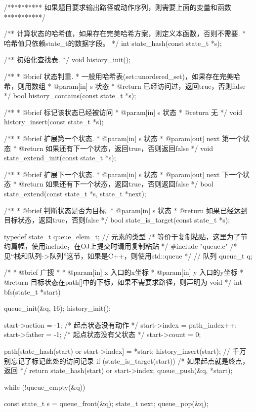 \begin{Codex}[label=bfs_template.c]
/********** 如果题目要求输出路径或动作序列，则需要上面的变量和函数 ***********/

/** 计算状态的哈希值，如果存在完美哈希方案，则定义本函数，否则不需要.
 * 哈希值只依赖state_t的数据字段。
 */
int state_hash(const state_t *s);

/** 初始化查找表. */
void history_init();

/**
 * @brief 状态判重.
 * 一般用哈希表(set::unordered_set)，如果存在完美哈希，则用数组
 * @param[in] s 状态
 * @return 已经访问过，返回true，否则false
 */
bool history_contains(const state_t *s);

/**
 * @brief 标记该状态已经被访问
 * @param[in] s 状态
 * @return 无
 */
void history_insert(const state_t *s);

/**
 * @brief 扩展第一个状态.
 * @param[in] s 状态
 * @param[out] next 第一个状态
 * @return 如果还有下一个状态，返回true，否则返回false
 */
void state_extend_init(const state_t *s);

/**
 * @brief 扩展下一个状态.
 * @param[in] s 状态
 * @param[out] next 下一个状态
 * @return 如果还有下一个状态，返回true，否则返回false
 */
bool state_extend(const state_t *s, state_t *next);

/**
 * @brief 判断状态是否为目标.
 * @param[in] s 状态
 * @return 如果已经达到目标状态，返回true，否则false
 */
bool state_is_target(const state_t *s);

typedef state_t queue_elem_t; // 元素的类型
/* 等价于复制粘贴，这里为了节约篇幅，使用include，在OJ上提交时请用复制粘贴 */
#include "queue.c"  /* 见“栈和队列->队列”这节，如果是C++，则使用std::queue */
// 队列
queue_t q;

/*
 * @brief 广搜
 *
 * @param[in] x 入口的x坐标
 * @param[in] y 入口的y坐标
 * @return 目标状态在path[]中的下标，如果不需要求路径，则声明为 void
 */
int bfs(state_t *start) {
    queue_init(&q, 16);
    history_init();

    start->action = -1;   /* 起点状态没有动作 */
    start->index = path_index++;
    start->father = -1;   /* 起点状态没有父状态 */
    start->count = 0;

    path[state_hash(start) or start->index] = *start;
    history_insert(start); // 千万别忘记了标记此处的访问记录
    if (state_is_target(start)) /* 如果起点就是终点，返回 */
        return state_hash(start) or start->index;
    queue_push(&q, *start);

    while (!queue_empty(&q)) {
        const state_t s = queue_front(&q);
        state_t next;
        queue_pop(&q);

}}
\end{Codex}
